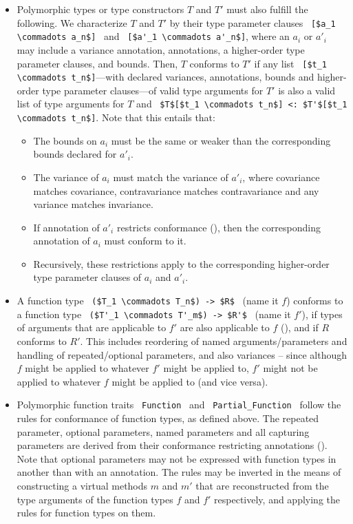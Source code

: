 \begin{itemize}
  \item Polymorphic types or type constructors $T$ and $T'$ must also fulfill the following. We characterize $T$ and $T'$ by their type parameter clauses ~\lstinline![$a_1 \commadots a_n$]!~ and ~\lstinline![$a'_1 \commadots a'_n$]!, where an $a_i$ or $a'_i$ may include a variance annotation, annotations, a higher-order type parameter clauses, and bounds. Then, $T$ conforms to $T'$ if any list ~\lstinline![$t_1 \commadots t_n$]!---with declared variances, annotations, bounds and higher-order type parameter clauses---of valid type arguments for $T'$ is also a valid list of type arguments for $T$ and ~\lstinline!$T$[$t_1 \commadots t_n$] <: $T'$[$t_1 \commadots t_n$]!. Note that this entails that:
  \begin{itemize}
    \item The bounds on $a_i$ must be the same or weaker than the corresponding bounds declared for $a'_i$. 
    \item The variance of $a_i$ must match the variance of $a'_i$, where covariance matches covariance, contravariance matches contravariance and any variance matches invariance. 
    \item If annotation of $a'_i$ restricts conformance (), then the corresponding annotation of $a_i$ must conform to it. 
    \item Recursively, these restrictions apply to the corresponding higher-order type parameter clauses of $a_i$ and $a'_i$. 
  \end{itemize}

  \item A function type ~\lstinline!($T_1 \commadots T_n$) -> $R$!~ (name it $f$) conforms to a function type ~\lstinline!($T'_1 \commadots T'_m$) -> $R'$!~ (name it $f'$), if types of arguments that are applicable to $f'$ are also applicable to $f$ (), and if $R$ conforms to $R'$. This includes reordering of named arguments/parameters and handling of repeated/optional parameters, and also variances -- since although $f$ might be applied to whatever $f'$ might be applied to, $f'$ might not be applied to whatever $f$ might be applied to (and vice versa).

  \item Polymorphic function traits ~\lstinline!Function!~ and ~\lstinline!Partial_Function!~ follow the rules for conformance of function types, as defined above. The repeated parameter, optional parameters, named parameters and all capturing parameters are derived from their conformance restricting annotations (). Note that optional parameters may not be expressed with function types in another than with an annotation. The rules may be inverted in the means of constructing a virtual methods $m$ and $m'$ that are reconstructed from the type arguments of the function types $f$ and $f'$ respectively, and applying the rules for function types on them.
 

\end{itemize}
